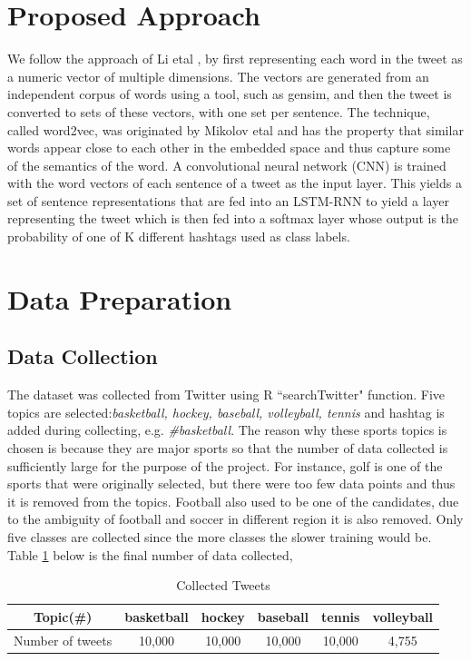 \documentclass[journal, a4paper]{IEEEtran}
\begin{document}
\section{Proposed Approach}
We follow the approach of Li etal \cite{Li-lstm}, by first representing each word in the tweet as a numeric vector of multiple dimensions. The vectors are generated from an independent corpus of words using a tool, such as gensim, and then the tweet is converted to sets of these vectors, with one set per sentence. The technique, called word2vec, was originated by Mikolov etal \cite{word2vec} and has the property that similar words appear close to each other in the embedded space and thus capture some of the semantics of the word.
A convolutional neural network (CNN) is trained with the word vectors of each sentence of a tweet as the input layer. This yields a set of sentence representations that are fed into an LSTM-RNN to yield a layer representing the tweet which is then fed into a softmax layer whose output is the probability of one of K different hashtags used as class labels.
\section{Data Preparation}
\subsection{Data Collection}
The dataset was collected from Twitter using R ``searchTwitter" function. Five topics are selected:{\em basketball, hockey, baseball, volleyball, tennis} and hashtag is added during collecting, e.g. \textit{\#basketball}. The reason why these sports topics is chosen is because they are major sports so that the number of data collected is sufficiently large for the purpose of the project. For instance, golf is one of the sports that were originally selected, but there were too few data points and thus it is removed from the topics. Football also used to be one of the candidates, due to the ambiguity of football and soccer in different region it is also removed. Only five classes are collected since the more classes the slower training would be. Table \ref{Tab:1} below is the final number of data collected,
\begin{table}[ht]
	\begin{center}
		\begin{tabular}{|c|c|c|c|c|c|}
			\hline\hline
			Topic(\#) & basketball & hockey & baseball &tennis &volleyball\\
			\hline
			Number of tweets & 10,000 & 10,000 & 10,000 & 10,000 & 4,755\\
			\hline
		\end{tabular}
	\end{center}
	\caption{Collected Tweets}\label{Tab:1}
\end{table}
\end{document}
